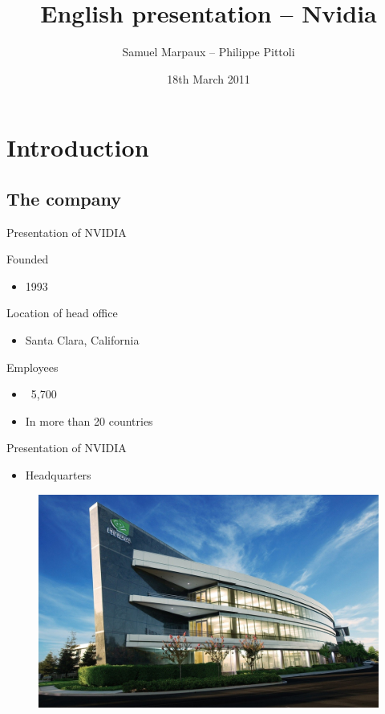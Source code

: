 \documentclass{beamer}
\date{18th March 2011}
\author{Samuel Marpaux -- Philippe Pittoli}
\title[Nvidia]{English presentation -- Nvidia}
\begin{document}

\section{Introduction}
\subsection{The company}
\begin{frame}{Presentation of NVIDIA}
	\transdissolve[duration=0.03]

	\begin{block}{Founded}
		\begin{itemize}
			\item<+->{1993}
		\end{itemize}
	\end{block}	
	\pause
	\begin{block}{Location of head office}
		\begin{itemize}
			\item<+->{Santa Clara, California}
		\end{itemize}
	\end{block}
	\pause
	\begin{block}{Employees}
		\begin{itemize}
			\item<+->{~5,700}
			\item<+->{In more than 20 countries}
		\end{itemize}
	\end{block}
\end{frame}

\begin{frame}{Presentation of NVIDIA}
	\transdissolve[duration=0.08]
	\begin{itemize}
		\item<+->{Headquarters}
	\end{itemize}
	\begin{figure}[h]
		\includegraphics[width=1.00\textheight]{NVIDIA_HEADQUARTERS.jpg}
	\end{figure}
\end{frame}
\end{document}

